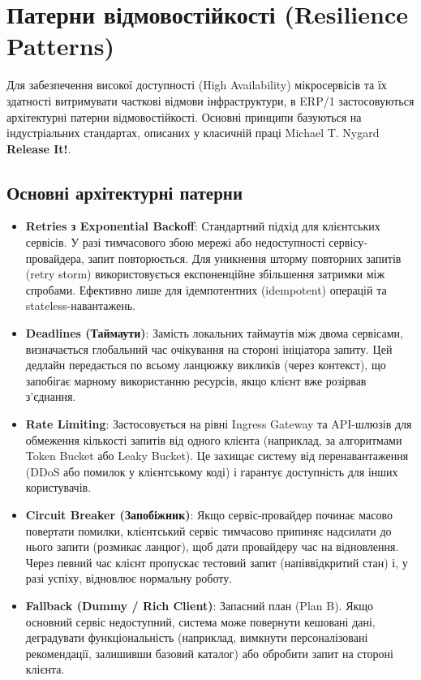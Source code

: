 \documentclass[12pt,a4paper]{article}
\begin{document}
\newpage
\section{Патерни відмовостійкості (Resilience Patterns)}

Для забезпечення високої доступності (High Availability) мікросервісів та їх здатності витримувати часткові відмови інфраструктури, в ERP/1 застосовуються архітектурні патерни відмовостійкості. Основні принципи базуються на індустріальних стандартах, описаних у класичній праці Michael T. Nygard \textbf{\guillemotleft Release It!\guillemotright}.

\subsection{Основні архітектурні патерни}

\begin{itemize}[leftmargin=1.5cm]
    \item \textbf{Retries з Exponential Backoff}: Стандартний підхід для клієнтських сервісів. У разі тимчасового збою мережі або недоступності сервісу-провайдера, запит повторюється. Для уникнення шторму повторних запитів (retry storm) використовується експоненційне збільшення затримки між спробами. Ефективно лише для ідемпотентних (idempotent) операцій та stateless-навантажень.
    \item \textbf{Deadlines (Таймаути)}: Замість локальних таймаутів між двома сервісами, визначається глобальний час очікування на стороні ініціатора запиту. Цей дедлайн передається по всьому ланцюжку викликів (через контекст), що запобігає марному використанню ресурсів, якщо клієнт вже розірвав з'єднання.
    \item \textbf{Rate Limiting}: Застосовується на рівні Ingress Gateway та API-шлюзів для обмеження кількості запитів від одного клієнта (наприклад, за алгоритмами Token Bucket або Leaky Bucket). Це захищає систему від перенавантаження (DDoS або помилок у клієнтському коді) і гарантує доступність для інших користувачів.
    \item \textbf{Circuit Breaker (Запобіжник)}: Якщо сервіс-провайдер починає масово повертати помилки, клієнтський сервіс тимчасово припиняє надсилати до нього запити (\guillemotleft розмикає ланцюг\guillemotright), щоб дати провайдеру час на відновлення. Через певний час клієнт пропускає тестовий запит (\guillemotleft напіввідкритий стан\guillemotright) і, у разі успіху, відновлює нормальну роботу.
    \item \textbf{Fallback (Dummy / Rich Client)}: Запасний план (Plan B). Якщо основний сервіс недоступний, система може повернути кешовані дані, деградувати функціональність (наприклад, вимкнути персоналізовані рекомендації, залишивши базовий каталог) або обробити запит на стороні клієнта.
\end{itemize}
\end{document}
